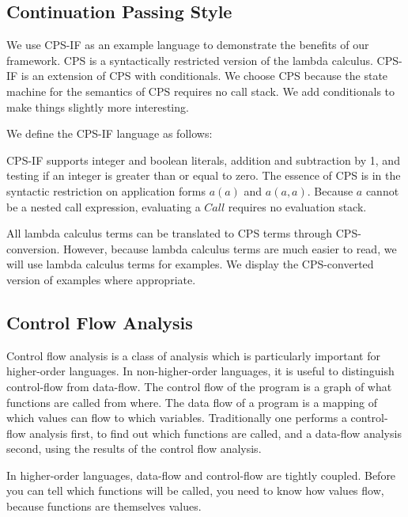 \documentclass{article}
\begin{document}

\subsection{Continuation Passing Style}
\label{section:Background:ContinuationPassingStyle}

We use CPS-IF as an example language to demonstrate the benefits of our framework.
CPS is a syntactically restricted version of the lambda calculus.
CPS-IF is an extension of CPS with conditionals.
We choose CPS because the state machine for the semantics of CPS requires no call stack.
We add conditionals to make things slightly more interesting.

We define the CPS-IF language as follows:


CPS-IF supports integer and boolean literals, addition and subtraction by 1, and testing if an integer is greater than or equal to zero.
The essence of CPS is in the syntactic restriction on application forms $a(a)$ and $a(a,a)$.  
Because $a$ cannot be a nested call expression, evaluating a $Call$ requires no evaluation stack.

All lambda calculus terms can be translated to CPS terms through CPS-conversion.
However, because lambda calculus terms are much easier to read, we will use lambda calculus terms for examples.
We display the CPS-converted version of examples where appropriate.


\subsection{Control Flow Analysis}
\label{section:Background:ControlFlowAnalysis}

Control flow analysis is a class of analysis which is particularly important for higher-order languages.
In non-higher-order languages, it is useful to distinguish control-flow from data-flow.
The control flow of the program is a graph of what functions are called from where.
The data flow of a program is a mapping of which values can flow to which variables.
Traditionally one performs a control-flow analysis first, to find out which functions are called, and a data-flow analysis second, using the results of the control flow analysis.

In higher-order languages, data-flow and control-flow are tightly coupled.
Before you can tell which functions will be called, you need to know how values flow, because functions are themselves values.
\end{document}
